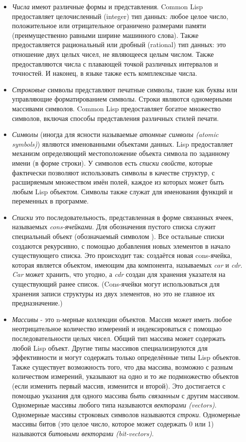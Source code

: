 \begin{itemize}
\item
\emph{Числа} имеют различные формы и представления. Common Lisp
предоставляет целочисленный (integer) тип данных: любое целое
число, положительное или отрицательное ограничено размерами памяти
(преимущественно равными ширине машинного слова). Также
предоставляется рациональный или дробный (rational) тип данных:
это отношение двух целых чисел, не являющееся целым числом. Также
предоставляются числа с плавающей точкой различных интервалов и
точностей. И наконец, в языке также есть комплексные числа. 

\item
\emph{Строковые} символы представляют печатные символы, такие как
буквы или управляющие форматированием символы. Строки являются
одномерными массивами символов. Common Lisp предоставляет богатое
множество символов, включая способы представления различных
стилей печати. 

\item
\emph{Символы} (иногда для ясности называемые \emph{атомные символы (atomic
  symbols)})
являются именованными объектами данных. Lisp предоставляет
механизм определяющий местоположение объекта символа по заданному
имени (в форме строки). У символов есть \emph{списки свойств},
которые фактически позволяют использовать символы в качестве
структур, с расширяемым множеством имён полей, каждое из которых
может быть любым Lisp объектом. Символы также служат для
именования функций и переменных в программе. 

\item
\emph{Списки}  это последовательность, представленная в форме связанных
ячеек, называемых \emph{cons-ячейками}. Для обозначения пустого
списка служит специальный объект (обозначаемый символом
{\nil}). Все остальные списки создаются рекурсивно, с помощью
добавления новых элементов в начало существующего списка. Это
происходит так: создаётся новая cons-ячейка, которая является
объектом, имеющим два компонента, называемых \emph{car} и \emph{cdr}. \emph{Car}
может хранить, что угодно, а \emph{cdr} создан для хранения 
указателя на существующий ранее список. (Cons-ячейки могут
использоваться для хранения записи структуры из двух
элементов, но это не главное их предназначение.) 

\item
\emph{Массивы} - это n-мерные коллекции объектов. Массив может
иметь любое неотрицательное количество измерений и индексироваться
с помощью последовательности целых чисел. Общий тип массива может
содержать любой Lisp объект. Другие типы массивов специализируются
для эффективности и могут содержать только определённые типы Lisp
объектов. Также существует возможность того, что два массива,
возможно с разным количеством измерений, указывают на одно и то же
подмножество объектов (если изменить первый массив, изменится и
второй). Это достигается с помощью указания для одного массива
\emph{быть связанным} с другим массивом. Одномерные массивы
любого типа называются \emph{векторами (vectors)}. Одномерные
массивы строковых символов называются \emph{строки}. Одномерные
массивы битов (это целое число, которое может содержать 0 или 1)
называются \emph{битовыми векторами (bit-vectors)}. 


\end{itemize}
